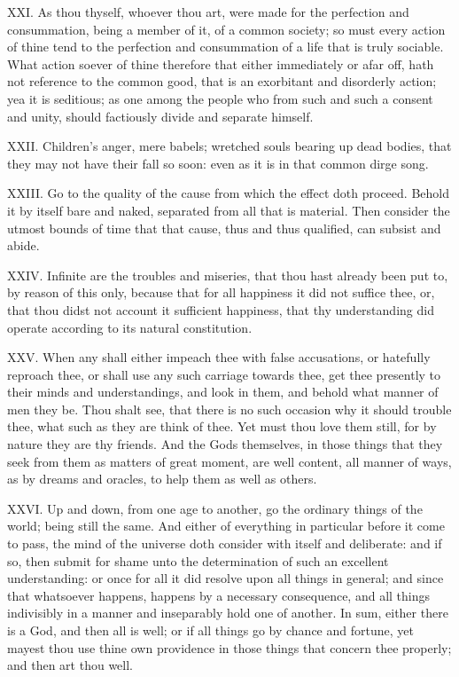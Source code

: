 XXI. As thou thyself, whoever thou art, were made for the perfection and
consummation, being a member of it, of a common society; so must every
action of thine tend to the perfection and consummation of a life that is
truly sociable. What action soever of thine therefore that either
immediately or afar off, hath not reference to the common good, that is an
exorbitant and disorderly action; yea it is seditious; as one among the
people who from such and such a consent and unity, should factiously
divide and separate himself.

XXII. Children's anger, mere babels; wretched souls bearing up dead
bodies, that they may not have their fall so soon: even as it is in that
common dirge song.

XXIII. Go to the quality of the cause from which the effect doth
proceed. Behold it by itself bare and naked, separated from all that is
material. Then consider the utmost bounds of time that that cause, thus
and thus qualified, can subsist and abide.

XXIV. Infinite are the troubles and miseries, that thou hast already
been put to, by reason of this only, because that for all happiness it did
not suffice thee, or, that thou didst not account it sufficient happiness,
that thy understanding did operate according to its natural constitution.

XXV. When any shall either impeach thee with false accusations, or
hatefully reproach thee, or shall use any such carriage towards thee, get
thee presently to their minds and understandings, and look in them, and
behold what manner of men they be. Thou shalt see, that there is no such
occasion why it should trouble thee, what such as they are think of thee.
Yet must thou love them still, for by nature they are thy friends. And the
Gods themselves, in those things that they seek from them as matters of
great moment, are well content, all manner of ways, as by dreams and
oracles, to help them as well as others.

XXVI. Up and down, from one age to another, go the ordinary things of
the world; being still the same. And either of everything in particular
before it come to pass, the mind of the universe doth consider with itself
and deliberate: and if so, then submit for shame unto the determination of
such an excellent understanding: or once for all it did resolve upon all
things in general; and since that whatsoever happens, happens by a
necessary consequence, and all things indivisibly in a manner and
inseparably hold one of another. In sum, either there is a God, and then
all is well; or if all things go by chance and fortune, yet mayest thou
use thine own providence in those things that concern thee properly; and
then art thou well.

